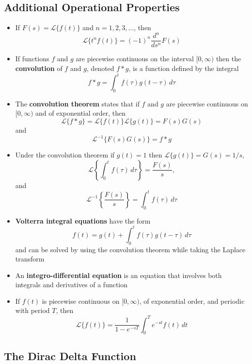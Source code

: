 \documentclass{article}
\begin{document}
\subsection{Additional Operational Properties}

\begin{itemize}
  \item If $F(s) = \mathcal{L}\{f(t)\}$ and $n = 1, 2, 3, \ldots$, then \[\mathcal{L}\{t^n f(t)\} = (-1)^n \frac{d^n}{d s^n} F(s)\]

\item If functions $f$ and $g$ are piecewise continuous on the interval $[0, \infty)$ then the \textbf{convolution} of $f$ and $g$, denoted $f * g$, is a function defined by the integral \[f * g = \int_0^t f(\tau) g(t - \tau) \,d\tau\]

  \item The \textbf{convolution theorem} states that if $f$ and $g$ are piecewise continuous on $[0, \infty)$ and of exponential order, then \[\mathcal{L}\{f * g\} = \mathcal{L}\{f(t)\} \mathcal{L}\{g(t)\} = F(s) G(s)\] and \[\mathcal{L}^{-1}\{F(s) G(s)\} = f * g\]

  \item Under the convolution theorem if $g(t) = 1$ then $\mathcal{L}\{g(t)\} = G(s) = 1 / s$, \[\mathcal{L} \left\{ \int_0^t f(\tau) \,d\tau \right\} = \frac{F(s)}{s},\] and \[\mathcal{L}^{-1}\left\{\frac{F(s)}{s}\right\} = \int_0^t f(\tau) \,d\tau\]

  \item \textbf{Volterra integral equations} have the form \[f(t) = g(t) + \int_0^t f(\tau) g(t - \tau) \,d\tau\] and can be solved by using the convolution theorem while taking the Laplace transform

  \item An \textbf{integro-differential equation} is an equation that involves both integrals and derivatives of a function

\item If $f(t)$ is piecewise continuous on $[0, \infty)$, of exponential order, and periodic with period $T$, then \[\mathcal{L}\{f(t)\} = \frac{1}{1 - e^{-s T}} \int_0^T e^{-s t} f(t) \,dt\]
\end{itemize}

\subsection{The Dirac Delta Function}
\end{document}
